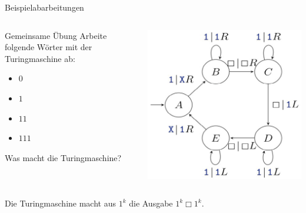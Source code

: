 \begin{frame}{Beispielabarbeitungen}
	\begin{columns}
		\begin{column}{0.5\textwidth}
			\begin{taskblock}{Gemeinsame Übung}
				Arbeite folgende Wörter mit der Turingmaschine ab:
				\begin{itemize}
					\item $0$
					\item $1$
					\item $11$
					\item $111$
				\end{itemize}
				Was macht die Turingmaschine?
			\end{taskblock}
		\end{column}
	
		\begin{column}{0.5\textwidth}
			\includegraphics[scale=0.4]{images/turingmaschine_1k.png}
		\end{column}
	\end{columns}

	\pause
	
	Die Turingmaschine macht aus $1^k$ die Ausgabe $1^k \Box 1^k$.
\end{frame}

